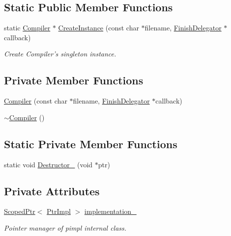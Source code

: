\subsection*{Static Public Member Functions}
\begin{DoxyCompactItemize}
\item 
static \hyperlink{classmocha_1_1_compiler}{Compiler} $\ast$ \hyperlink{classmocha_1_1_compiler_af64d5202d445d5bc7b95a78ffc62e64d}{CreateInstance} (const char $\ast$filename, \hyperlink{classmocha_1_1_finish_delegator}{FinishDelegator} $\ast$callback)
\begin{DoxyCompactList}\small\item\em Create Compiler's singleton instance. \end{DoxyCompactList}\end{DoxyCompactItemize}
\subsection*{Private Member Functions}
\begin{DoxyCompactItemize}
\item 
\hyperlink{classmocha_1_1_compiler_ac035cb9e52bca34a7592839d5da8a507}{Compiler} (const char $\ast$filename, \hyperlink{classmocha_1_1_finish_delegator}{FinishDelegator} $\ast$callback)
\item 
\hyperlink{classmocha_1_1_compiler_acb77008ede2a0ac3c63361bdb58660a8}{$\sim$Compiler} ()
\end{DoxyCompactItemize}
\subsection*{Static Private Member Functions}
\begin{DoxyCompactItemize}
\item 
static void \hyperlink{classmocha_1_1_compiler_a3cfbf9b6ad2969124cf0383045b35917}{Destructor\_\-} (void $\ast$ptr)
\end{DoxyCompactItemize}
\subsection*{Private Attributes}
\begin{DoxyCompactItemize}
\item 
\hyperlink{classmocha_1_1_scoped_ptr}{ScopedPtr}$<$ \hyperlink{classmocha_1_1_compiler_1_1_ptr_impl}{PtrImpl} $>$ \hyperlink{classmocha_1_1_compiler_a5054f7154cef5bf6e452c1e8448e933f}{implementation\_\-}
\begin{DoxyCompactList}\small\item\em Pointer manager of pimpl internal class. \end{DoxyCompactList}\end{DoxyCompactItemize}
